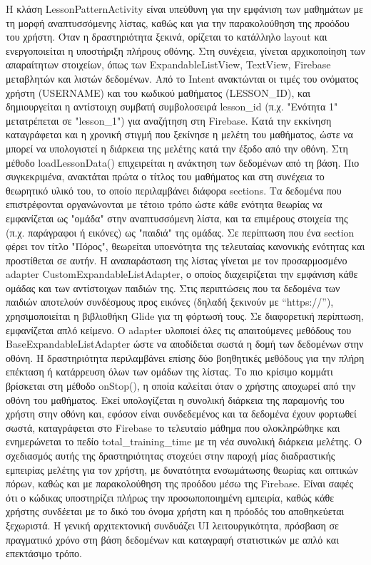 \documentclass[11pt]{report}
\begin{document}
Η κλάση LessonPatternActivity είναι υπεύθυνη για την εμφάνιση των μαθημάτων με τη μορφή αναπτυσσόμενης λίστας, καθώς και για την παρακολούθηση της προόδου του χρήστη. Όταν η δραστηριότητα ξεκινά, ορίζεται το κατάλληλο layout και ενεργοποιείται η υποστήριξη πλήρους οθόνης. Στη συνέχεια, γίνεται αρχικοποίηση των απαραίτητων στοιχείων, όπως των ExpandableListView, TextView, Firebase μεταβλητών και λιστών δεδομένων. Από το Intent ανακτώνται οι τιμές του ονόματος χρήστη (USERNAME) και του κωδικού μαθήματος (LESSON\_ID), και δημιουργείται η αντίστοιχη συμβατή συμβολοσειρά lesson\_id (π.χ. "Ενότητα 1" μετατρέπεται σε "lesson\_1") για αναζήτηση στη Firebase.
Κατά την εκκίνηση καταγράφεται και η χρονική στιγμή που ξεκίνησε η μελέτη του μαθήματος, ώστε να μπορεί να υπολογιστεί η διάρκεια της μελέτης κατά την έξοδο από την οθόνη. Στη μέθοδο loadLessonData() επιχειρείται η ανάκτηση των δεδομένων από τη βάση. Πιο συγκεκριμένα, ανακτάται πρώτα ο τίτλος του μαθήματος και στη συνέχεια το θεωρητικό υλικό του, το οποίο περιλαμβάνει διάφορα sections. Τα δεδομένα που επιστρέφονται οργανώνονται με τέτοιο τρόπο ώστε κάθε ενότητα θεωρίας να εμφανίζεται ως "ομάδα" στην αναπτυσσόμενη λίστα, και τα επιμέρους στοιχεία της (π.χ. παράγραφοι ή εικόνες) ως "παιδιά" της ομάδας. Σε περίπτωση που ένα section φέρει τον τίτλο "Πόρος", θεωρείται υποενότητα της τελευταίας κανονικής ενότητας και προστίθεται σε αυτήν.
Η αναπαράσταση της λίστας γίνεται με τον προσαρμοσμένο adapter CustomExpandableListAdapter, ο οποίος διαχειρίζεται την εμφάνιση κάθε ομάδας και των αντίστοιχων παιδιών της. Στις περιπτώσεις που τα δεδομένα των παιδιών αποτελούν συνδέσμους προς εικόνες (δηλαδή ξεκινούν με “https://”), χρησιμοποιείται η βιβλιοθήκη Glide για τη φόρτωσή τους. Σε διαφορετική περίπτωση, εμφανίζεται απλό κείμενο. Ο adapter υλοποιεί όλες τις απαιτούμενες μεθόδους του BaseExpandableListAdapter ώστε να αποδίδεται σωστά η δομή των δεδομένων στην οθόνη.
Η δραστηριότητα περιλαμβάνει επίσης δύο βοηθητικές μεθόδους για την πλήρη επέκταση ή κατάρρευση όλων των ομάδων της λίστας. Το πιο κρίσιμο κομμάτι βρίσκεται στη μέθοδο onStop(), η οποία καλείται όταν ο χρήστης αποχωρεί από την οθόνη του μαθήματος. Εκεί υπολογίζεται η συνολική διάρκεια της παραμονής του χρήστη στην οθόνη και, εφόσον είναι συνδεδεμένος και τα δεδομένα έχουν φορτωθεί σωστά, καταγράφεται στο Firebase το τελευταίο μάθημα που ολοκληρώθηκε και ενημερώνεται το πεδίο total\_training\_time με τη νέα συνολική διάρκεια μελέτης.
Ο σχεδιασμός αυτής της δραστηριότητας στοχεύει στην παροχή μίας διαδραστικής εμπειρίας μελέτης για τον χρήστη, με δυνατότητα ενσωμάτωσης θεωρίας και οπτικών πόρων, καθώς και με παρακολούθηση της προόδου μέσω της Firebase. Είναι σαφές ότι ο κώδικας υποστηρίζει πλήρως την προσωποποιημένη εμπειρία, καθώς κάθε χρήστης συνδέεται με το δικό του όνομα χρήστη και η πρόοδός του αποθηκεύεται ξεχωριστά. Η γενική αρχιτεκτονική συνδυάζει UI λειτουργικότητα, πρόσβαση σε πραγματικό χρόνο στη βάση δεδομένων και καταγραφή στατιστικών με απλό και επεκτάσιμο τρόπο.
\end{document}

